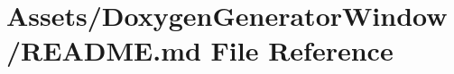 \hypertarget{_assets_2_doxygen_generator_window_2_r_e_a_d_m_e_8md}{}\section{Assets/\+Doxygen\+Generator\+Window/\+R\+E\+A\+D\+ME.md File Reference}
\label{_assets_2_doxygen_generator_window_2_r_e_a_d_m_e_8md}
